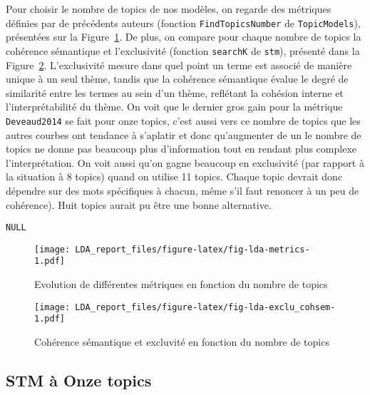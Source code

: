 \documentclass[
  letterpaper,
  DIV=11,
  numbers=noendperiod]{scrartcl}
\begin{document}
Pour choisir le nombre de topics de nos modèles, on regarde des
métriques définies par de précédents auteurs (fonction
\texttt{FindTopicsNumber} de \texttt{TopicModels}), présentées sur la
Figure~\ref{fig-lda-metrics}. De plus, on compare pour chaque nombre de
topics la cohérence sémantique et l'exclusivité (fonction
\texttt{searchK} de \texttt{stm}), présenté dans la
Figure~\ref{fig-lda-exclu_cohsem}. L'exclusivité mesure dans quel point
un terme est associé de manière unique à un seul thème, tandis que la
cohérence sémantique évalue le degré de similarité entre les termes au
sein d'un thème, reflétant la cohésion interne et l'interprétabilité du
thème. On voit que le dernier gros gain pour la métrique
\texttt{Deveaud2014} se fait pour onze topics, c'est aussi vers ce
nombre de topics que les autres courbes ont tendance à s'aplatir et donc
qu'augmenter de un le nombre de topics ne donne pas beaucoup plus
d'information tout en rendant plus complexe l'interprétation. On voit
aussi qu'on gagne beaucoup en exclusivité (par rapport à la situation à
8 topics) quand on utilise 11 topics. Chaque topic devrait donc dépendre
sur des mots spécifiques à chacun, même s'il faut renoncer à un peu de
cohérence). Huit topics aurait pu être une bonne alternative.

\begin{verbatim}
NULL
\end{verbatim}

\begin{figure}

{\centering \texttt{[image: LDA\_report\_files/figure-latex/fig-lda-metrics-1.pdf]}

}

\caption{\label{fig-lda-metrics}Evolution de différentes métriques en
fonction du nombre de topics}

\end{figure}

\begin{figure}

{\centering \texttt{[image: LDA\_report\_files/figure-latex/fig-lda-exclu\_cohsem-1.pdf]}

}

\caption{\label{fig-lda-exclu_cohsem}Cohérence sémantique et excluvité
en fonction du nombre de topics}

\end{figure}

\hypertarget{stm-uxe0-onze-topics}{%
\subsection{STM à Onze topics}\label{stm-uxe0-onze-topics}}
\end{document}
